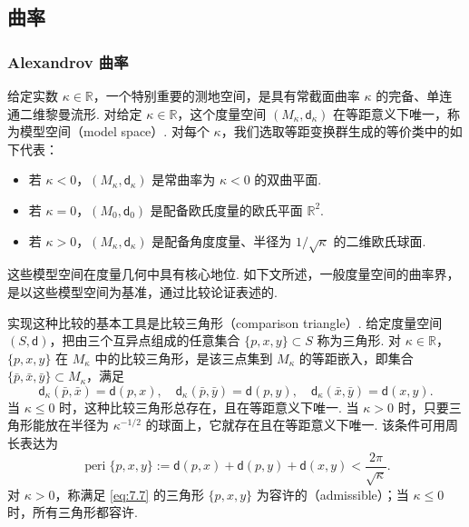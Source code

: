 \subsection{曲率}\label{sec:7.2}
\subsubsection{Alexandrov 曲率}\label{sec:7.2.1}
给定实数 $\kappa\in\mathbb R$，一个特别重要的测地空间，是具有常截面曲率 $\kappa$ 的完备、单连通二维黎曼流形. 对给定 $\kappa\in\mathbb R$，这个度量空间 $(M_\kappa,\mathsf d_\kappa)$ 在等距意义下唯一，称为模型空间（model space）. 对每个 $\kappa$，我们选取等距变换群生成的等价类中的如下代表：
\begin{itemize}
\item 若 $\kappa<0$，$(M_\kappa,\mathsf d_\kappa)$ 是常曲率为 $\kappa<0$ 的双曲平面.
\item 若 $\kappa=0$，$(M_0,\mathsf d_0)$ 是配备欧氏度量的欧氏平面 $\mathbb R^2$.
\item 若 $\kappa>0$，$(M_\kappa,\mathsf d_\kappa)$ 是配备角度度量、半径为 $1/\sqrt\kappa$ 的二维欧氏球面.
\end{itemize}
这些模型空间在度量几何中具有核心地位. 如下文所述，一般度量空间的曲率界，是以这些模型空间为基准，通过比较论证表述的.

实现这种比较的基本工具是比较三角形（comparison triangle）. 给定度量空间 $(S,\mathsf d)$，把由三个互异点组成的任意集合 $\{p,x,y\}\subset S$ 称为三角形. 对 $\kappa\in\mathbb R$，$\{p,x,y\}$ 在 $M_\kappa$ 中的比较三角形，是该三点集到 $M_\kappa$ 的等距嵌入，即集合 $\{\bar p,\bar x,\bar y\}\subset M_\kappa$，满足
$$\mathsf d_\kappa(\bar p,\bar x)=\mathsf d(p,x),\quad
\mathsf d_\kappa(\bar p,\bar y)=\mathsf d(p,y),\quad
\mathsf d_\kappa(\bar x,\bar y)=\mathsf d(x,y).$$
当 $\kappa\le0$ 时，这种比较三角形总存在，且在等距意义下唯一. 当 $\kappa>0$ 时，只要三角形能放在半径为 $\kappa^{-1/2}$ 的球面上，它就存在且在等距意义下唯一. 该条件可用周长表达为
\begin{equation}\label{eq:7.7}
\operatorname{peri}\{p,x,y\}:=\mathsf d(p,x)+\mathsf d(p,y)+\mathsf d(x,y)<\frac{2\pi}{\sqrt\kappa}.
\end{equation}
对 $\kappa>0$，称满足 \eqref{eq:7.7} 的三角形 $\{p,x,y\}$ 为容许的（admissible）；当 $\kappa\le0$ 时，所有三角形都容许.

